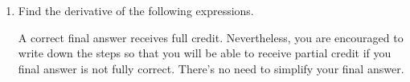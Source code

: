 \documentclass[11pt]{article}
\begin{document}
\begin{enumerate}
\begin{center}
        \begin{tabular}{l c r l c r}
            $\displaystyle\frac{d}{dx}\left[ -4x^{9} \right]$ & $=$ & \rule[-8pt]{1.5in}{0.4pt} &
            \vspace{4cm}
            $\displaystyle\frac{d}{dx}\left[ \dfrac{2}{\sqrt{x^3}} \right]$ & $=$ & \rule[-8pt]{1.5in}{0.4pt}\\[0.3in]
            \vspace{4cm}
            $\displaystyle\frac{d}{dx}\left[ 4^x \right]$ & $=$ & \rule[-8pt]{1.5in}{0.4pt} & 
            $\displaystyle\frac{d}{dx}\left[ \frac{\pi^2}{6} \right]$ & $=$ & \rule[-8pt]{1.5in}{0.4pt}\\[0.3in]
            \vspace{4cm}
            $\displaystyle\frac{d}{dx}\left[ x^2 + x+1 \right]$ & $=$ & \rule[-8pt]{1.5in}{0.4pt}&
            $\displaystyle\frac{d}{dx}\left[ \ln(x) + x \right]$ & $=$ & \rule[-8pt]{1.5in}{0.4pt}\\[0.3in]
            \vspace{3cm}
            $\displaystyle\frac{d}{dx}\left[ \log_2(x^5) \right]$ & $=$ & \rule[-8pt]{1.5in}{0.4pt} & 
            $\displaystyle\frac{d}{dx}\left[ \frac{1}{x} + \frac{2}{x^2} \right]$ & $=$ & \rule[-8pt]{1.5in}{0.4pt}\\[0.3in]
        \end{tabular}
        
\end{center}



\newpage


\item Find the derivative of the following expressions. 

A correct final answer receives full credit. Nevertheless, you are encouraged to write down the steps so that you will be able to receive partial credit if you final answer is not fully correct. There's no need to simplify your final answer.


\end{enumerate}
\end{document}
